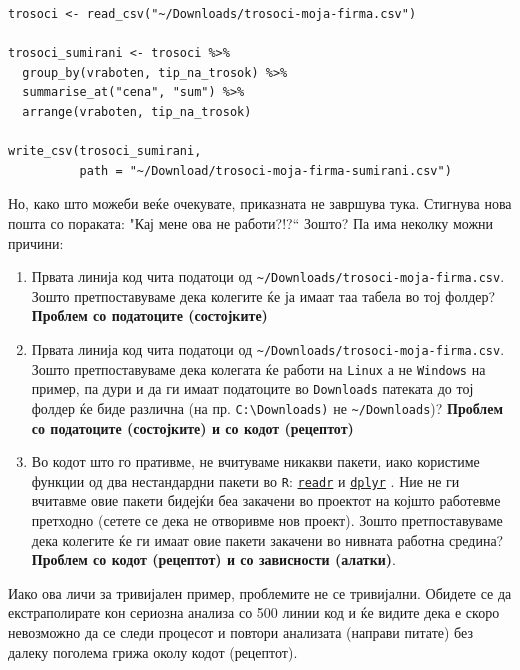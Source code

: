 \documentclass[
]{book}
\begin{document}
\begin{verbatim}
trosoci <- read_csv("~/Downloads/trosoci-moja-firma.csv")

trosoci_sumirani <- trosoci %>% 
  group_by(vraboten, tip_na_trosok) %>% 
  summarise_at("cena", "sum") %>% 
  arrange(vraboten, tip_na_trosok)

write_csv(trosoci_sumirani, 
          path = "~/Download/trosoci-moja-firma-sumirani.csv")
\end{verbatim}

Но, како што можеби веќе очекувате, приказната не завршува тука. Стигнува нова пошта со пораката: "Кај мене ова не работи?!?{}`` Зошто? Па има неколку можни причини:

\begin{enumerate}
\def\labelenumi{\arabic{enumi}.}
\item
  Првата линија код чита податоци од \texttt{\textasciitilde{}/Downloads/trosoci-moja-firma.csv}. Зошто претпоставуваме дека колегите ќе ја имаат таа табела во тој фолдер? \textbf{Проблем со податоците (состојките)}
\item
  Првата линија код чита податоци од \texttt{\textasciitilde{}/Downloads/trosoci-moja-firma.csv}. Зошто претпоставуваме дека колегата ќе работи на \texttt{Linux} а не \texttt{Windows} на пример, па дури и да ги имаат податоците во \texttt{Downloads} патеката до тој фолдер ќе биде различна (на пр. \texttt{C:\textbackslash{}Downloads)} не \texttt{\textasciitilde{}/Downloads})? \textbf{Проблем со податоците (состојките) и со кодот (рецептот)}
\item
  Во кодот што го пративме, не вчитуваме никакви пакети, иако користиме функции од два нестандардни пакети во \texttt{R}: \href{https://www.rdocumentation.org/packages/readr/versions/1.3.1}{\texttt{readr}} \citep{R-readr} и \href{https://www.rdocumentation.org/packages/dplyr/versions/0.7.8}{\texttt{dplyr}} \citep{R-dplyr}. Ние не ги вчитавме овие пакети бидејќи беа закачени во проектот на којшто работевме претходно (сетете се дека не отворивме нов проект). Зошто претпоставуваме дека колегите ќе ги имаат овие пакети закачени во нивната работна средина? \textbf{Проблем со кодот (рецептот) и со зависности (алатки)}.
\end{enumerate}

Иако ова личи за тривијален пример, проблемите не се тривијални. Обидете се да екстраполирате кон сериозна анализа со 500 линии код и ќе видите дека е скоро невозможно да се следи процесот и повтори анализата (направи питате) без далеку поголема грижа околу кодот (рецептот).
\end{document}
